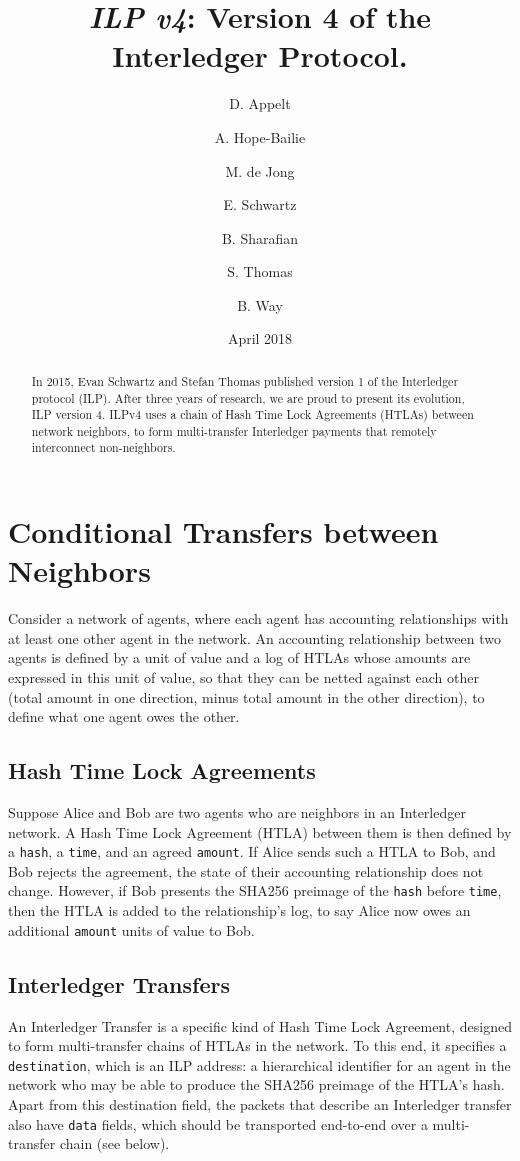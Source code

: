\documentclass[11pt,twoside,a4paper]{article}
\begin{document}
\title{{\em ILP v4}: Version 4 of the Interledger Protocol.}
\author{D. Appelt \and A. Hope-Bailie \and M. de Jong \and E. Schwartz \and B. Sharafian \and S. Thomas \and B. Way}
\date{April 2018}
\maketitle
\begin{abstract}
In 2015, Evan Schwartz and Stefan Thomas published version 1 of the Interledger protocol (ILP). After three years of research,
we are proud to present its evolution, ILP version 4. ILPv4 uses a chain of Hash Time Lock Agreements (HTLAs) between network neighbors, to form
multi-transfer Interledger payments that remotely interconnect non-neighbors.
\end{abstract}

\section{Conditional Transfers between Neighbors}
Consider a network of agents, where each agent has accounting relationships with at least one other agent in the network. An accounting
relationship between two agents is defined by a unit of value and a log of HTLAs whose amounts are expressed in this unit of value, so that they
can be netted against each other (total amount in one direction, minus total amount in the other direction), to define what one agent owes the other.

\subsection{Hash Time Lock Agreements}
Suppose Alice and Bob are two agents who are neighbors in an Interledger network. A Hash Time Lock Agreement (HTLA) between them is then
defined by a {\tt hash}, a {\tt time}, and an agreed {\tt amount}. If Alice sends such a HTLA to Bob, and Bob rejects the agreement, the state of their accounting
relationship does not change. However, if Bob presents the SHA256 preimage of the {\tt hash} before {\tt time}, then the HTLA is added to the relationship's log, to say Alice
now  owes an additional {\tt amount} units of value to Bob.

\subsection{Interledger Transfers}
An Interledger Transfer is a specific kind of Hash Time Lock Agreement, designed to form multi-transfer chains of HTLAs in the network. To this end,
it specifies a {\tt destination}, which is an ILP address: a hierarchical identifier for an agent in the network who may be able to produce the SHA256 preimage of the
HTLA's hash. Apart from this destination field, the packets that describe an Interledger transfer also have {\tt data} fields, which should be transported end-to-end over a multi-transfer chain (see below).
\end{document}
